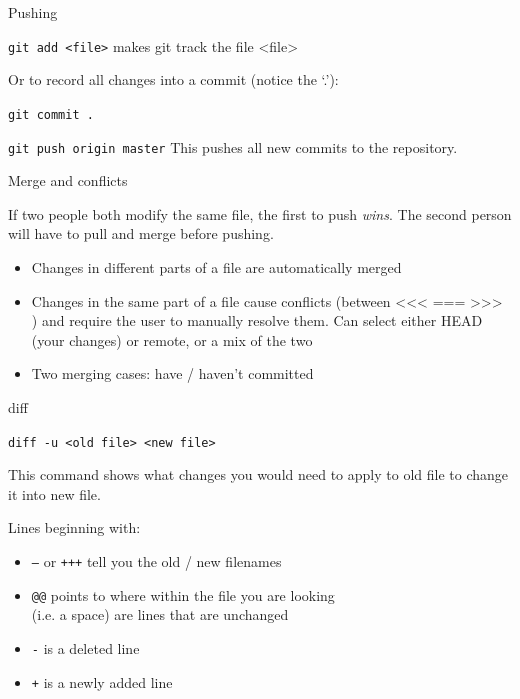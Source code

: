 \documentclass{beamer}
\begin{document}
\begin{frame}{Pushing}

\texttt{git add <file>} makes git track the file <file> 

Or to record all changes into a commit (notice the ‘.’):

\texttt{git commit .} 

\texttt{git push origin master} This pushes all new commits to the repository.


\end{frame}


\begin{frame}{Merge and conflicts}

If two people both modify the same file, the first to push \emph{wins}.
The second person will have to pull and merge before pushing.

\begin{itemize}
 \item Changes in different parts of a file are automatically merged
 \item Changes in the same part of a file cause conflicts (between <<<
=== >>> ) and require the user to manually resolve them. Can
select either HEAD (your changes) or remote, or a mix of the two
\item Two merging cases: have / haven't committed
\end{itemize}

\end{frame}

\begin{frame}{diff}

\texttt{diff -u <old file> <new file>} 

This command shows what changes you would need to apply to old file to change it into
new file.

Lines beginning with:
\begin{itemize}
 \item \texttt{--\-} or \texttt{+++} tell you the old / new filenames
 \item \texttt{@@} points to where within the file you are looking \\
       (i.e. a space) are lines that are unchanged
 \item \texttt{-} is a deleted line
 \item \texttt{+} is a newly added line
\end{itemize}

\end{frame}
\end{document}
